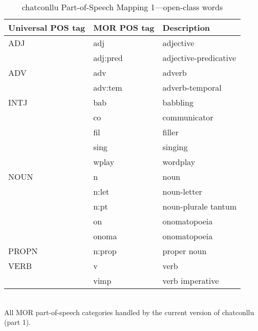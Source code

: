 \newpage
\begin{table}[htp!]
\caption {chatconllu Part-of-Speech Mapping 1---open-class words} \label{tab:posmap1}
\centering
\begin{tabularx}{\linewidth}{@{}llX@{}}
\toprule
\textbf{Universal POS tag} & \textbf{MOR POS tag} & \textbf{Description}\\ \midrule
ADJ & adj & adjective\\
 & adj:pred & adjective-predicative\\\addlinespace
ADV & adv & adverb\\
 & adv:tem & adverb-temporal\\\addlinespace
INTJ & bab & babbling\\
 & co & communicator\\
 & fil & filler\\
 & sing & singing\\
 & wplay & wordplay\\\addlinespace
NOUN & n & noun\\
 & n:let & noun-letter\\
 & n:pt & noun-plurale tantum\\
 & on & onomatopoeia\\
 & onoma & onomatopoeia\\\addlinespace
PROPN & n:prop & proper noun\\\addlinespace
VERB & v & verb\\
 & vimp & verb imperative\\\bottomrule
\end{tabularx}\\
\vspace{0.5cm}
All MOR part-of-speech categories handled by the current version of chatconllu (part 1).\\
\end{table}

